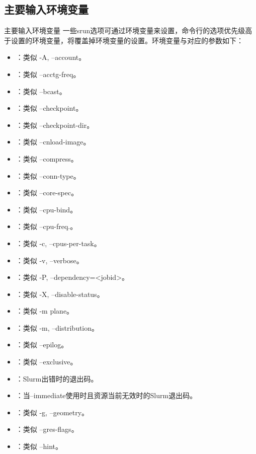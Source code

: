 \subsection{主要输入环境变量}
\begin{frame}{主要输入环境变量}
一些srun选项可通过环境变量来设置，命令行的选项优先级高于设置的环境变量，将覆盖掉环境变量的设置。环境变量与对应的参数如下：
\begin{itemize}
	\item {}：类似 -A, --account。
	\item {}：类似 --acctg-freq。
	\item {}：类似 --bcast。
	\item {}：类似 --checkpoint。
	\item {}：类似 --checkpoint-dir。
	\item {}：类似 --cnload-image。
	\item {}：类似 --compress。
	\item {}：类似 --conn-type。
	\item {}：类似 --core-spec。
	\item {}：类似 --cpu-bind。
	\item {}：类似 --cpu-freq.。
	\item {}：类似 -c, --cpus-per-task。
	\item {}：类似 -v, --verbose。
	\item {}：类似 -P, --dependency=<jobid>。
	\item {}：类似 -X, --disable-status。
	\item {}：类似 -m plane。
	\item {}：类似 -m, --distribution。
	\item {}：类似 --epilog。
	\item {}：类似 --exclusive。
	\item {}：Slurm出错时的退出码。
	\item {}：当--immediate使用时且资源当前无效时的Slurm退出码。
	\item {}：类似 -g, --geometry。
	\item {}：类似 --gres-flags。
	\item {}：类似 --hint。

\end{itemize}
\end{frame}
